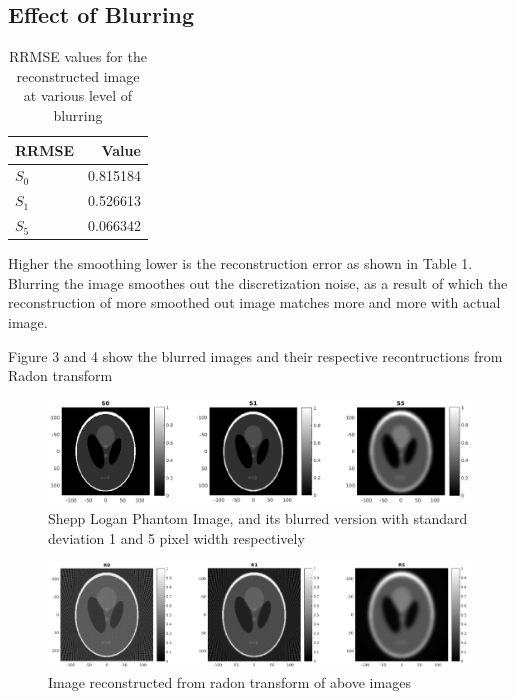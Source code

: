\documentclass[11pt]{article}
\begin{document}
\subsection{Effect of Blurring}
\begin{table}[!h]
\begin{center}
  \begin{tabular}{ | l | r |}
    \hline
    RRMSE & Value \\
    \hline
    $S_{0}$ & 0.815184 \\
	$S_{1}$ & 0.526613 \\
	$S_{5}$ & 0.066342 \\ \hline
  \end{tabular}
\end{center}
\caption[Table caption text]{RRMSE values for the reconstructed image at various level of blurring}
\end{table}
Higher the smoothing lower is the reconstruction error as shown in Table 1.
Blurring the image smoothes out the discretization noise, as a result of which the reconstruction of more smoothed out image
matches more and more with actual image.

Figure 3 and 4 show the blurred images and their respective recontructions from Radon transform

\begin{figure}[!h]
\centering
\includegraphics[scale=0.4]{S015}
\caption{Shepp Logan Phantom Image, and its blurred version with standard deviation 1 and 5 pixel width respectively}
\end{figure}

\begin{figure}[!h]
\centering
\includegraphics[scale=0.3]{R015}
\caption{Image reconstructed from radon transform of above images}
\end{figure}
\end{document}
